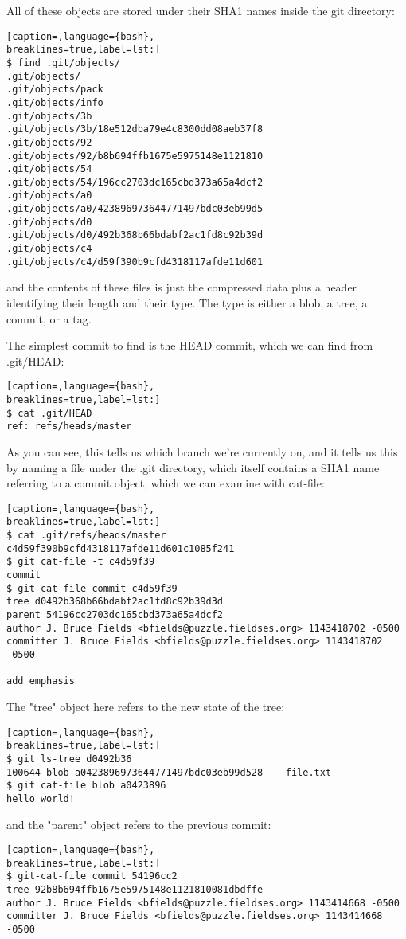 All of these objects are stored under their SHA1 names inside the git
directory:
\lstset{basicstyle=\scriptsize, numbers=none, captionpos=b, tabsize=4}
\begin{lstlisting}[caption=,language={bash},
breaklines=true,label=lst:]
$ find .git/objects/
.git/objects/
.git/objects/pack
.git/objects/info
.git/objects/3b
.git/objects/3b/18e512dba79e4c8300dd08aeb37f8
.git/objects/92
.git/objects/92/b8b694ffb1675e5975148e1121810
.git/objects/54
.git/objects/54/196cc2703dc165cbd373a65a4dcf2
.git/objects/a0
.git/objects/a0/423896973644771497bdc03eb99d5
.git/objects/d0
.git/objects/d0/492b368b66bdabf2ac1fd8c92b39d
.git/objects/c4
.git/objects/c4/d59f390b9cfd4318117afde11d601
\end{lstlisting}

and the contents of these files is just the compressed data plus a header
identifying their length and their type. The type is either a blob, a tree, a
commit, or a tag.

The simplest commit to find is the HEAD commit, which we can find from
.git/HEAD:
\lstset{basicstyle=\scriptsize, numbers=none, captionpos=b, tabsize=4}
\begin{lstlisting}[caption=,language={bash},
breaklines=true,label=lst:]
$ cat .git/HEAD
ref: refs/heads/master
\end{lstlisting}

As you can see, this tells us which branch we're currently on, and it tells us
this by naming a file under the .git directory, which itself contains a SHA1
name referring to a commit object, which we can examine with cat-file:
\lstset{basicstyle=\scriptsize, numbers=none, captionpos=b, tabsize=4}
\begin{lstlisting}[caption=,language={bash},
breaklines=true,label=lst:]
$ cat .git/refs/heads/master
c4d59f390b9cfd4318117afde11d601c1085f241
$ git cat-file -t c4d59f39
commit
$ git cat-file commit c4d59f39
tree d0492b368b66bdabf2ac1fd8c92b39d3d
parent 54196cc2703dc165cbd373a65a4dcf2
author J. Bruce Fields <bfields@puzzle.fieldses.org> 1143418702 -0500
committer J. Bruce Fields <bfields@puzzle.fieldses.org> 1143418702 -0500

add emphasis
\end{lstlisting}

The "tree" object here refers to the new state of the tree:
\lstset{basicstyle=\scriptsize, numbers=none, captionpos=b, tabsize=4}
\begin{lstlisting}[caption=,language={bash},
breaklines=true,label=lst:]
$ git ls-tree d0492b36
100644 blob a0423896973644771497bdc03eb99d528    file.txt
$ git cat-file blob a0423896
hello world!
\end{lstlisting}

and the "parent" object refers to the previous commit:
\lstset{basicstyle=\scriptsize, numbers=none, captionpos=b, tabsize=4}
\begin{lstlisting}[caption=,language={bash},
breaklines=true,label=lst:]
$ git-cat-file commit 54196cc2
tree 92b8b694ffb1675e5975148e1121810081dbdffe
author J. Bruce Fields <bfields@puzzle.fieldses.org> 1143414668 -0500
committer J. Bruce Fields <bfields@puzzle.fieldses.org> 1143414668 -0500
\end{lstlisting}
